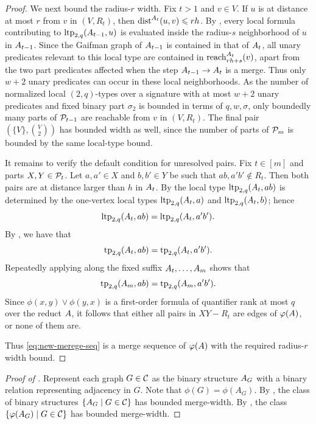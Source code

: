 \begin{proof}
  We next bound the radius-\(r\) width. Fix \(t>1\) and \(v\in V\).
  If \(u\) is at distance at most \(r\) from \(v\) in \((V,R_t)\), then
  \(\dist^{\str A_t}(u,v)\le rh\).
  By , every local formula contributing to
  \(\ltp_{2,q}(\str A_{t-1},u)\) is evaluated inside the radius-\(s\)
  neighborhood of \(u\) in \(\str A_{t-1}\).  Since the Gaifman graph of
  \(\str A_{t-1}\) is contained in that of \(\str A_t\), all unary predicates
  relevant to this local type are contained in
  \(\reach^{\str A_t}_{rh+s}(v)\), apart from the two part predicates affected
  when the step \(\str A_{t-1}\to\str A_t\) is a merge.  Thus only \(w+2\)
  unary predicates can occur in these local neighborhoods.
  As the number of normalized local \((2,q)\)-types over a signature with at most
  \(w+2\) unary predicates and fixed binary part \(\sigma_2\) is bounded in terms
  of \(q,w,\sigma\), only boundedly many parts of \(\cal P_{t-1}\) are reachable
  from \(v\) in \((V,R_t)\).  The final pair \((\{V\},\binom V2)\) has bounded
  width as well, since the number of parts of \(\cal P_m\) is bounded by the same
  local-type bound.

  It remains to verify the default condition for unresolved pairs.  Fix \(t\in[m]\)
  and parts \(X,Y\in\cal P_t\).  Let \(a,a'\in X\) and \(b,b'\in Y\) be such that
  \(ab,a'b'\notin R_t\).  Then both pairs are at distance larger than \(h\) in
  \(\str A_t\).  By  the local type
  \(\ltp_{2,q}(\str A_t,ab)\) is determined by the one-vertex local types
  \(\ltp_{2,q}(\str A_t,a)\) and \(\ltp_{2,q}(\str A_t,b)\); hence
  \[
      \ltp_{2,q}(\str A_t,ab)=\ltp_{2,q}(\str A_t,a'b').
  \]
  By , we have that
  \[
      \tp_{2,q}(\str A_t,ab)=\tp_{2,q}(\str A_t,a'b').
  \]
  Repeatedly applying  along the fixed
  suffix \(\str A_t,\ldots,\str A_m\) shows that
  \[
      \tp_{2,q}(\str A_m,ab)=\tp_{2,q}(\str A_m,a'b').
  \]
  Since \(\phi(x,y)\lor\phi(y,x)\) is a first-order formula of quantifier rank
  at most \(q\) over the reduct \(\str A\), it follows that either all pairs in
  \(XY-R_t\) are edges of \(\phi(\str A)\), or none of them are.

  Thus \eqref{eq:new-merege-seq} is a merge sequence of \(\phi(\str A)\) with the
  required radius-\(r\) width bound.
\end{proof}

\begin{proof}[Proof of ]
    Represent each graph \(G\in\CC\) as the binary
  structure \(\str A_G\) with a binary relation representing adjacency in $G$.  
  Note that $\phi(G)=\phi(A_G)$.
  By ,
  the class of binary structures $\setof{A_G}{G\in\CC}$ has bounded merge-width.  
  By 
 ,
 the class $\setof{\phi(A_G)}{G\in\CC}$ has bounded merge-width.
\end{proof}
